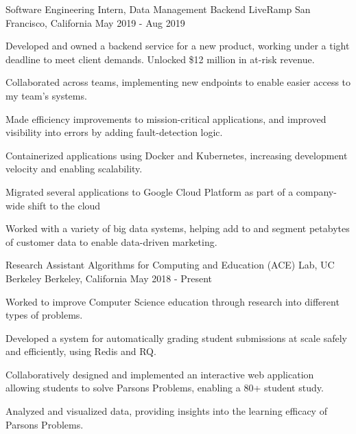 

\begin{cventries}

    \cventry
      {Software Engineering Intern, Data Management Backend}
      {LiveRamp}
      {San Francisco, California}
      {May 2019 - Aug 2019}
      {
        \begin{cvitems}
          \item Developed and owned a backend service for a new product, working under a tight deadline to meet client demands. Unlocked \$12 million in at-risk revenue.
          \item Collaborated across teams, implementing new endpoints to enable easier access to my team's systems.
          \item Made efficiency improvements to mission-critical applications, and improved visibility into errors by adding fault-detection logic.
          \item Containerized applications using Docker and Kubernetes, increasing development velocity and enabling scalability.
          \item Migrated several applications to Google Cloud Platform as part of a company-wide shift to the cloud
          \item Worked with a variety of big data systems, helping add to and segment petabytes of customer data to enable data-driven marketing.
        \end{cvitems}
      }

    \cventry
      {Research Assistant}
      {Algorithms for Computing and Education (ACE) Lab, UC Berkeley}
      {Berkeley, California}
      {May 2018 - Present}
      {
        \begin{cvitems}
          \item Worked to improve Computer Science education through research into different types of problems.
          \item Developed a system for automatically grading student submissions at scale safely and efficiently, using Redis and RQ.
          \item Collaboratively designed and implemented an interactive web application allowing students to solve Parsons Problems, enabling a 80+ student study. 
          \item Analyzed and visualized data, providing insights into the learning efficacy of Parsons Problems.
        \end{cvitems}  
      }

\end{cventries}

